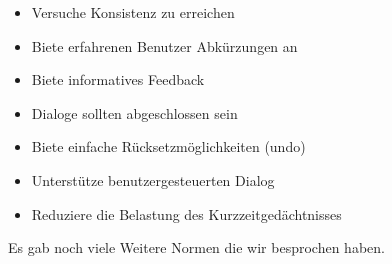 \documentclass[a4paper]{article}
\begin{document}
\begin{itemize}
    \item Versuche Konsistenz zu erreichen
    \item Biete erfahrenen Benutzer Abkürzungen an
    \item Biete informatives Feedback
    \item Dialoge sollten abgeschlossen sein
    \item Biete einfache Rücksetzmöglichkeiten (undo)
    \item Unterstütze benutzergesteuerten Dialog
    \item Reduziere die Belastung des Kurzzeitgedächtnisses
\end{itemize}


Es gab noch viele Weitere Normen die wir besprochen haben.
\end{document}
